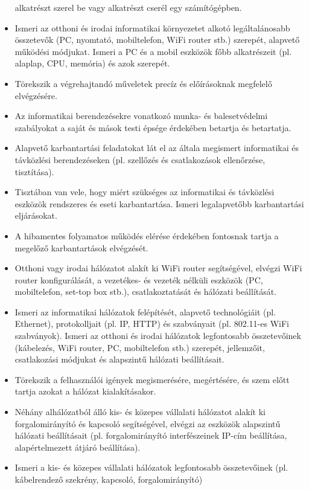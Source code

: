 \begin{itemize}
  alkatrészt szerel be vagy alkatrészt cserél egy számítógépben.
\item
  Ismeri az otthoni és irodai informatikai környezetet alkotó
  legáltalánosabb összetevők (PC, nyomtató, mobiltelefon, WiFi router
  stb.) szerepét, alapvető működési módjukat. Ismeri a PC és a mobil
  eszközök főbb alkatrészeit (pl. alaplap, CPU, memória) és azok
  szerepét.
\item
  Törekszik a végrehajtandó műveletek precíz és előírásoknak megfelelő
  elvégzésére.
\item
  Az informatikai berendezésekre vonatkozó munka- és balesetvédelmi
  szabályokat a saját és mások testi épsége érdekében betartja és
  betartatja.
\item
  Alapvető karbantartási feladatokat lát el az általa megismert
  informatikai és távközlési berendezéseken (pl. szellőzés és
  csatlakozások ellenőrzése, tisztítása).
\item
  Tisztában van vele, hogy miért szükséges az informatikai és távközlési
  eszközök rendszeres és eseti karbantartása. Ismeri legalapvetőbb
  karbantartási eljárásokat.
\item
  A hibamentes folyamatos működés elérése érdekében fontosnak tartja a
  megelőző karbantartások elvégzését.
\item
  Otthoni vagy irodai hálózatot alakít ki WiFi router segítségével,
  elvégzi WiFi router konfigurálását, a vezetékes- és vezeték nélküli
  eszközök (PC, mobiltelefon, set-top box stb.), csatlakoztatását és
  hálózati beállítását.
\item
  Ismeri az informatikai hálózatok felépítését, alapvető technológiáit
  (pl. Ethernet), protokolljait (pl. IP, HTTP) és szabványait (pl.
  802.11-es WiFi szabványok). Ismeri az otthoni és irodai hálózatok
  legfontosabb összetevőinek (kábelezés, WiFi router, PC, mobiltelefon
  stb.) szerepét, jellemzőit, csatlakozási módjukat és alapszintű
  hálózati beállításait.
\item
  Törekszik a felhasználói igények megismerésére, megértésére, és szem
  előtt tartja azokat a hálózat kialakításakor.
\item
  Néhány alhálózatból álló kis- és közepes vállalati hálózatot alakít ki
  forgalomirányító és kapcsoló segítségével, elvégzi az eszközök
  alapszintű hálózati beállításait (pl. forgalomirányító interfészeinek
  IP-cím beállítása, alapértelmezett átjáró beállítása).
\item
  Ismeri a kis- és közepes vállalati hálózatok legfontosabb
  összetevőinek (pl. kábelrendező szekrény, kapcsoló, forgalomirányító)

\end{itemize}
